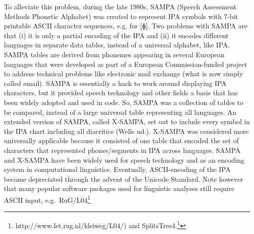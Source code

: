 {{{{{{{{{{{{{{{{{{{{{{{{{{{{{{To alleviate this problem, during the late 1980s, SAMPA (Speech Assessment Methods Phonetic Alphabet) was created to represent IPA symbols with 7-bit printable ASCII character sequences, e.g. for {[}ɸ{]}. Two problems with SAMPA are that (i) it is only a partial encoding of the IPA and (ii) it encodes different languages in separate data tables, instead of a universal alphabet, like IPA. SAMPA tables are derived from phonemes appearing in several European languages that were developed as part of a European Commission-funded project to address technical problems like electronic mail exchange (what is now simply called email). SAMPA is essentially a hack to work around displaying IPA characters, but it provided speech technology and other fields a basis that has been widely adopted and used in code. So, SAMPA was a collection of tables to be compared, instead of a large universal table representing all languages. An extended version of SAMPA, called X-SAMPA, set out to include every symbol in the IPA chart including all diacritics (Wells nd.). X-SAMPA was considered more universally applicable because it consisted of one table that encoded the set of characters that represented phones/segments in IPA across languages. SAMPA and X-SAMPA have been widely used for speech technology and as an encoding system in computational linguistics. Eventually, ASCII-encoding of the IPA became depreciated through the advent of the Unicode Standard. Note however that many popular software packages used for linguistic analyses still require ASCII input, e.g.~RuG/L04\footnote{http://www.let.rug.nl/kleiweg/L04/) and SplitsTree4.\footnote{http://www.splitstree.org/)

}}}}}}}}}}}}}}}}}}}}}}}}}}}}}}}}
